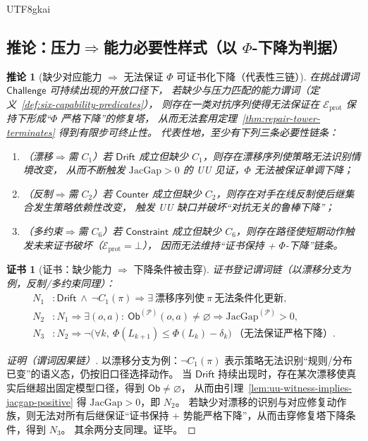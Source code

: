 \documentclass[12pt]{article}
\newtheorem{corollary}{推论}[section]
\newtheorem{Certificate}{证书}[section]
\newcommand{\JacGap}{\ensuremath{\mathrm{JacGap}}} %
\begin{document}
\begin{CJK*}{UTF8}{gkai}
\subsection{推论：压力$\Rightarrow$能力必要性样式（以 $\Phi$-下降为判据）}
\label{sec:pressure-implies-capability}

\begin{corollary}[缺少对应能力 $\Rightarrow$ 无法保证 $\Phi$ 可证书化下降（代表性三链）]
\label{cor:pressure-implies-capability-necessity}
在挑战谓词 $\mathsf{Challenge}$ 可持续出现的开放口径下，
若缺少与压力匹配的能力谓词（定义~\ref{def:six-capability-predicates}），
则存在一类对抗序列使得无法保证在 $\mathcal{E}_{\mathrm{prot}}$ 保持下形成“$\Phi$ 严格下降”的修复塔，
从而无法套用定理~\ref{thm:repair-tower-terminates} 得到有限步可终止性。
代表性地，至少有下列三条必要性链条：
\begin{enumerate}
  \item （漂移$\Rightarrow$需 $C_1$）若 $\mathsf{Drift}$ 成立但缺少 $C_1$，则存在漂移序列使策略无法识别情境改变，
  从而不断触发 $\JacGap>0$ 的 UU 见证，$\Phi$ 无法被保证单调下降；
  \item （反制$\Rightarrow$需 $C_2$）若 $\mathsf{Counter}$ 成立但缺少 $C_2$，则存在对手在线反制使后继集合发生策略依赖性改变，
  触发 UU 缺口并破坏“对抗无关的鲁棒下降”；
  \item （多约束$\Rightarrow$需 $C_6$）若 $\mathsf{Constraint}$ 成立但缺少 $C_6$，则存在路径使短期动作触发未来证书破坏（$\mathcal{E}_{\mathrm{prot}}
    =\bot$），
  因而无法维持“证书保持 + $\Phi$-下降”链条。
\end{enumerate}
\end{corollary}

\begin{Certificate}[证书：缺少能力 $\Rightarrow$ 下降条件被击穿]
\label{cert:pressure-implies-capability-necessity}
证书登记谓词链（以漂移分支为例，反制/多约束同理）：
\[
\begin{aligned}
  N_1 &: \mathsf{Drift}\ \wedge\ \neg C_1(\pi)\Rightarrow \exists\ \text{漂移序列使}\ \pi\ \text{无法条件化更新},\\
  N_2 &: N_1\Rightarrow \exists(o,a):\ \mathsf{Ob}^{(\mathcal{P})}(o,a)\neq\varnothing\Rightarrow \JacGap^{(\mathcal{P})}
    >0,\\
  N_3 &: N_2\Rightarrow \neg\bigl(\forall k,\ \Phi(L_{k+1})\le \Phi(L_k)-\delta_k\bigr)\ \text{（无法保证严格下降）}.
\end{aligned}
\]
\end{Certificate}

\begin{proof}[证明（谓词因果链）]
以漂移分支为例：$\neg C_1(\pi)$ 表示策略无法识别“规则/分布已变”的语义态，仍按旧口径选择动作。
当 $\mathsf{Drift}$ 持续出现时，存在某次漂移使真实后继超出固定模型口径，得到 $\mathsf{Ob}\neq\varnothing$，
从而由引理~\ref{lem:uu-witness-implies-jacgap-positive} 得 $\JacGap>0$，即 $N_2$。
若缺少对漂移的识别与对应修复动作族，则无法对所有后继保证“证书保持 + 势能严格下降”，从而击穿修复塔下降条件，得到 $N_3$。
其余两分支同理。证毕。
\end{proof}


\end{CJK*}
\end{document}
